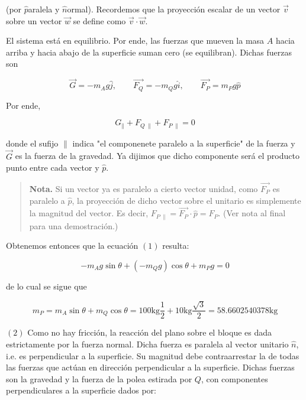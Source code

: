 \documentclass[12pt]{article}
\theoremstyle{definition}
\begin{document}
(por $\hat{p}$aralela y $\hat{n}$ormal). Recordemos que la proyección escalar de
un vector $\vec{v}$ sobre un vector $\vec{w}$ se define como $\vec{v} \cdot
\vec{w}$.

El sistema está en equilibrio. Por ende, las fuerzas que mueven la masa $A$
hacia arriba y hacia abajo de la superficie suman cero (se equilibran). Dichas
fuerzas son 

\begin{equation*}
    \vec{G} = -m_A g \hat{j}, \qquad \vec{F_Q} = -m_Qg \hat{i}, \qquad \vec{F_P}
    = m_P g \hat{p}
\end{equation*}

Por ende,

\begin{equation}
    G_{\parallel} + F_{Q ~ \parallel} + F_{P ~ \parallel} = 0
\end{equation}

donde el sufijo $\parallel$ indica "el componenete paralelo a la superficie" de
la fuerza y $\vec{G}$ es la fuerza de la gravedad. Ya dijimos que dicho
componente será el producto punto entre cada vector y $\hat{p}$. 


\small
\begin{quote}

\textbf{Nota.} Si un vector ya es paralelo a cierto vector unidad, como
$\vec{F_P}$ es paralelo a $\hat{p}$, la proyección de dicho vector sobre el
unitario es simplemente la magnitud del vector. Es decir, $F_{P ~ \parallel} =
\vec{F_P} \cdot \hat{p} = F_P$. (Ver nota al final para una demostración.) 
\end{quote}
\normalsize

Obtenemos entonces que la ecuación $(1)$ resulta:


\begin{equation}
    -m_A g \sin \theta  + (-m_Q g)\cos\theta + m_P g = 0
\end{equation}

de lo cual se sigue que 

\begin{equation*}
    m_P = m_A \sin \theta + m_Q \cos \theta = 100\text{kg}\frac{1}{2} +
    10\text{kg} \frac{\sqrt{3} }{2} = 58.6602540378\text{kg}
\end{equation*}



$(2)$ Como no hay fricción, la reacción del plano sobre el bloque es dada
estrictamente por la fuerza normal. Dicha fuerza es paralela al vector unitario
$\hat{n}$, i.e. es perpendicular a la superficie. Su magnitud debe
contraarrestar la de todas las fuerzas que actúan en dirección perpendicular a
la superficie. Dichas fuerzas son la gravedad y la fuerza de la polea estirada
por $Q$, con componentes perpendiculares a la superficie dados por:
\end{document}
